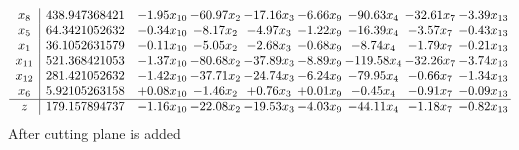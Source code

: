 \documentclass[8pt]{article}
\begin{document}
\[\begin{array}{c| c c@{\hskip 2pt} c@{\hskip 2pt} c@{\hskip 2pt} c@{\hskip 2pt} c@{\hskip 2pt} c@{\hskip 2pt} c@{\hskip 2pt} }
 x_{8}   &  438.947368421 & -1.95 x_{10} & -60.97 x_{2} & -17.16 x_{3} & -6.66 x_{9} & -90.63 x_{4} & -32.61 x_{7} & -3.39 x_{13}\\
 x_{5}   &  64.3421052632 & -0.34 x_{10} & -8.17 x_{2} & -4.97 x_{3} & -1.22 x_{9} & -16.39 x_{4} & -3.57 x_{7} & -0.43 x_{13}\\
 x_{1}   &  36.1052631579 & -0.11 x_{10} & -5.05 x_{2} & -2.68 x_{3} & -0.68 x_{9} & -8.74 x_{4} & -1.79 x_{7} & -0.21 x_{13}\\
 x_{11}   &  521.368421053 & -1.37 x_{10} & -80.68 x_{2} & -37.89 x_{3} & -8.89 x_{9} & -119.58 x_{4} & -32.26 x_{7} & -3.74 x_{13}\\
 x_{12}   &  281.421052632 & -1.42 x_{10} & -37.71 x_{2} & -24.74 x_{3} & -6.24 x_{9} & -79.95 x_{4} & -0.66 x_{7} & -1.34 x_{13}\\
 x_{6}   &  5.92105263158 & +  0.08 x_{10} & -1.46 x_{2} & +  0.76 x_{3} & +  0.01 x_{9} & -0.45 x_{4} & -0.91 x_{7} & -0.09 x_{13}\\
\hline
z    &  179.157894737 & -1.16 x_{10} & -22.08 x_{2} & -19.53 x_{3} & -4.03 x_{9} & -44.11 x_{4} & -1.18 x_{7} & -0.82 x_{13}\\
\end{array}\]
 After cutting plane is added 
\end{document}
